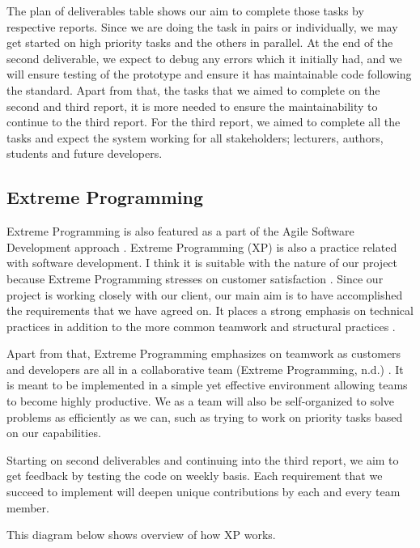 		The plan of deliverables table shows our aim to complete those tasks by respective reports. Since we are doing the task in pairs or individually, we may get started on high priority tasks and the others in parallel. At the end of the second deliverable, we expect to debug any errors which it initially had, and we will ensure testing of the prototype and ensure it has maintainable code following the standard. Apart from that, the tasks that we aimed to complete on the second and third report, it is more needed to ensure the maintainability to continue to the third report. For the third report, we aimed to complete all the tasks and expect the system working for all stakeholders; lecturers, authors, students and future developers. 
	
	
	\subsection*{Extreme Programming}
		Extreme Programming is also featured as a part of the Agile Software Development approach \cite{agileModeling}. Extreme Programming (XP) is also a practice related with software development. I think it is suitable with the nature of our project because Extreme Programming stresses on customer satisfaction \cite{agileXPFlowchart}. Since our project is working closely with our client, our main aim is to have accomplished the requirements that we have agreed on.  It places a strong emphasis on technical practices in addition to the more common teamwork and structural practices \cite{agileArtOfDevelopment}.
			
		Apart from that, Extreme Programming emphasizes on teamwork as customers and developers are all in a collaborative team (Extreme Programming, n.d.) \cite{agileXPFlowchart}. It is meant to be implemented in a simple yet effective environment allowing teams to become highly productive. We as a team will also be self-organized to solve problems as efficiently as we can, such as trying to  work on priority tasks based on our capabilities.
		
		Starting on second deliverables and continuing into the third report, we aim to get feedback by testing the code on weekly basis. Each requirement that we succeed to implement will deepen unique contributions by each and every team member. 
		
		This diagram below shows overview of how XP works.  
		
